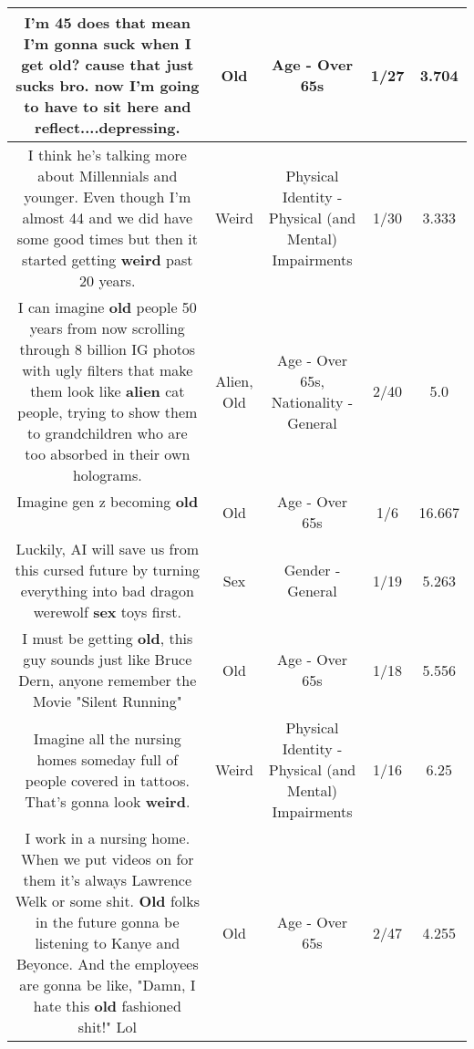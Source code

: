 \documentclass[11pt]{article}
\newlength\mylength
\begin{document}
\begin{center}
\begin{longtable}{|C{.65\mylength}|C{.30\mylength}|C{.12\mylength}|C{.12\mylength}|C{.12\mylength}|}
  \small I'm 45 does that mean I'm gonna suck when I get \textbf{old}? cause that just sucks bro. now I'm going to have to sit here and reflect....depressing.\normalsize   & Old & Age - Over 65s & 1/27 & 3.704 \\  \hline
  \small I think he's talking more about Millennials and younger. Even though I'm almost 44 and we did have some good times but then it started getting \textbf{weird} past 20 years.\normalsize   & Weird & Physical Identity - Physical (and Mental) Impairments & 1/30 & 3.333 \\  \hline
  \small I can imagine \textbf{old} people 50 years from now scrolling through 8 billion IG photos with ugly filters that make them look like \textbf{alien} cat people, trying to show them to grandchildren who are too absorbed in their own holograms.\normalsize   & Alien, Old & Age - Over 65s, Nationality - General & 2/40 & 5.0 \\  \hline
  \small Imagine gen z becoming \textbf{old} 🤣\normalsize   & Old & Age - Over 65s & 1/6 & 16.667 \\  \hline
  \small Luckily, AI will save us from this cursed future by turning everything into bad dragon werewolf \textbf{sex} toys first.\normalsize   & Sex & Gender - General & 1/19 & 5.263 \\  \hline
  \small I must be getting \textbf{old}, this guy sounds just like Bruce Dern, anyone remember the Movie "Silent Running"\normalsize   & Old & Age - Over 65s & 1/18 & 5.556 \\  \hline
  \small Imagine all the nursing homes someday full of people covered in tattoos.  That's gonna look \textbf{weird}.\normalsize   & Weird & Physical Identity - Physical (and Mental) Impairments & 1/16 & 6.25 \\  \hline
  \small I work in a nursing home. When we put videos on for them it's always Lawrence Welk or some shit. \textbf{Old} folks in the future gonna be listening to Kanye and Beyonce. And the employees are gonna be like, "Damn, I hate this \textbf{old} fashioned shit!" Lol\normalsize   & Old & Age - Over 65s & 2/47 & 4.255 \\  \hline

\end{longtable}
\end{center}
\end{document}
